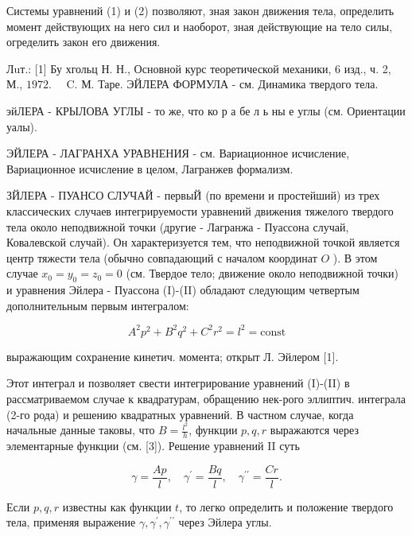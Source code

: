 \documentclass[10pt]{article}
\begin{document}
Системы уравнений (1) и (2) позволяют, зная закон движения тела, определить момент действующих на него сил и наоборот, зная действующие на тело силы, огределить закон его движения.



Лuт.: [1] Бу хгольц Н. Н., Основной курс теоретической механики, 6 изд., ч. 2, М., $1972 . \quad$ C. М. Таре. ЭЙЛЕРА ФОРМУЛА - см. Динамика твердого тела.



эйЛЕРА - КРЫЛОВА УГЛЫ - то же, что ко р а бе л ь ны е углы (см. Ориентации уалы).



ЭЙЛЕРА - ЛАГРАНХА УРАВНЕНИЯ - см. Вариационное исчисление, Вариационное исчисление в целом, Лагранжев формализм.



ЗЙЛЕРА - ПУАНСО СЛУЧАЙ - первыЙ (по времени и простейший) из трех классических случаев интегрируемости уравнений движения тяжелого твердого тела около неподвижной точки (другие - Лагранжа - Пуассона случай, Ковалевской случай). Он характеризуется тем, что неподвижной точкой является центр тяжести тела (обычно совпадающий с началом координат $O$ ). В этом случае $x_{0}=y_{0}=z_{0}=0$ (см. Твердое тело; движение около неподвижной точки) и уравнения Эйлера - Пуассона (I)-(II) обладают следующим четвертым дополнительным первым интегралом:



\[

A^{2} p^{2}+B^{2} q^{2}+C^{2} r^{2}=l^{2}=\mathrm{const}

\]



выражающим сохранение кинетич. момента; открыт Л. Эйлером [1].



Этот интеграл и позволяет свести интегрирование уравнений (I)-(II) в рассматриваемом случае к квадратурам, обращению нек-рого эллиптич. интеграла (2-го рода) и решению квадратных уравнений. В частном случае, когда начальные данные таковы, что $B=\frac{l^{2}}{h}$, функции $p, q, r$ выражаются через элементарные функции (см. [3]). Решение уравнений II суть



\[

\gamma=\frac{A p}{l}, \quad \gamma^{\prime}=\frac{B q}{l}, \quad \gamma^{\prime \prime}=\frac{C r}{l} .

\]



Если $p, q, r$ известны как функции $t$, то легко определить и положение твердого тела, применяя выражение $\gamma, \gamma^{\prime}, \gamma^{\prime \prime}$ через Эйлера углы.
\end{document}
